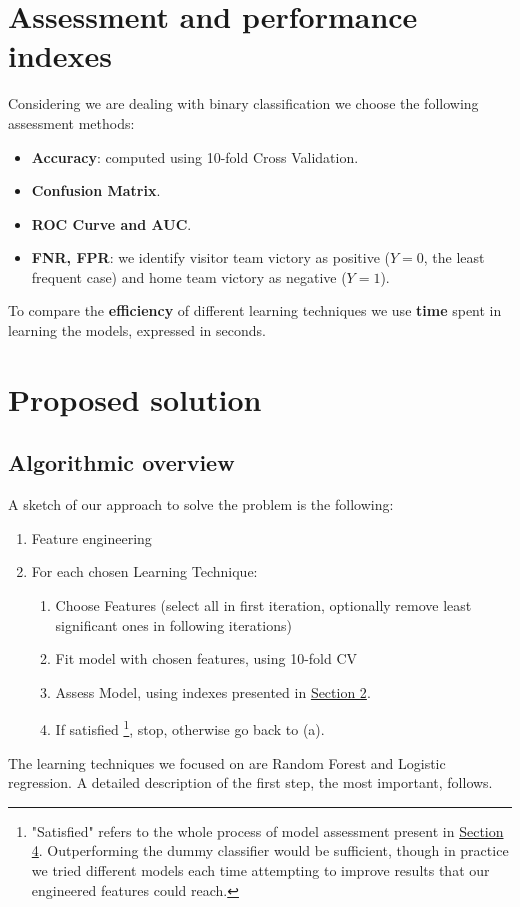 \documentclass{article}
\begin{document}
\section{Assessment and performance indexes}
\label{sec:Assex}
Considering we are dealing with binary classification we choose the following assessment methods:
\begin{itemize}
    \item \textbf{Accuracy}: computed using 10-fold Cross Validation.
    \item \textbf{Confusion Matrix}.
    \item \textbf{ROC Curve and AUC}.
    \item \textbf{FNR, FPR}: we identify visitor team victory as positive ($Y = 0$, the least frequent case) and home team victory as negative ($Y = 1$).
\end{itemize}
To compare the \textbf{efficiency} of different learning techniques we use \textbf{time} spent in learning the models, expressed in seconds.

\section{Proposed solution}
\label{sec:Proposedsol}
\subsection{Algorithmic overview}
A sketch of our approach to solve the problem is the following:
\begin{enumerate}
    \item Feature engineering
    \item For each chosen Learning Technique:
    \begin{enumerate}
        \item Choose Features (select all in first iteration, optionally remove least significant ones in following iterations)
        \item Fit model with chosen features, using 10-fold CV
        \item Assess Model, using indexes presented in \hyperref[sec:Assex]{Section 2}.
        \item If satisfied \footnote{"Satisfied" refers to the whole process of model assessment present in \hyperref[sec:ExpEva]{Section 4}. Outperforming the dummy classifier would be sufficient, though in practice we tried different models each time attempting to improve results that our engineered features could reach.}, stop, otherwise go back to (a).
    \end{enumerate}
\end{enumerate}
The learning techniques we focused on are Random Forest and Logistic regression. A detailed description of the first step, the most important, follows.
\end{document}
